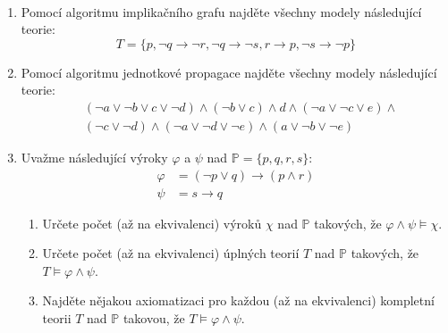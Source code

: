 \documentclass[a4paper]{amsart}
\theoremstyle{definition}
\begin{document}
        \medskip\begin{ukol}[3 body]{\,}
            \begin{enumerate}[label=\arabic*.]
            \item Pomocí algoritmu implikačního grafu najděte všechny modely následující teorie:
            $$
            T=\{p,\neg q \to \neg r,\neg q \to \neg s,r \to p,\neg s \to \neg p\}
            $$
            
            \item Pomocí algoritmu jednotkové propagace najděte všechny modely následující teorie:
            \begin{align*}
                &(\neg a \vee \neg b \vee c \vee \neg d)\wedge(\neg b \vee c)\wedge d \wedge (\neg a \vee \neg c \vee e)\wedge \\
                &(\neg c \vee \neg d)\wedge(\neg a \vee \neg d \vee \neg e)\wedge(a\vee \neg b \vee\neg e)
            \end{align*}
            
            \item Uvažme následující výroky $\varphi$ a $\psi$ nad $\mathbb P=\{p, q, r, s\}$:
            \begin{align*}
                \varphi &= (\neg p \vee  q)\to(p\wedge r)\\
                \psi &= s\to q
            \end{align*}
            \begin{enumerate}
                \item Určete počet (až na ekvivalenci) výroků $\chi$ nad $\mathbb P$ takových, že $\varphi\wedge\psi\models\chi$.
                \item Určete počet (až na ekvivalenci) úplných teorií $T$ nad $\mathbb P$ takových, že $T\models\varphi\wedge\psi$.
                \item Najděte nějakou axiomatizaci pro každou (až na ekvivalenci) kompletní teorii $T$ nad $\mathbb P$ takovou, že $T\models\varphi\wedge\psi$.
            \end{enumerate}
            \end{enumerate} 
            \end{ukol}
\end{document}
